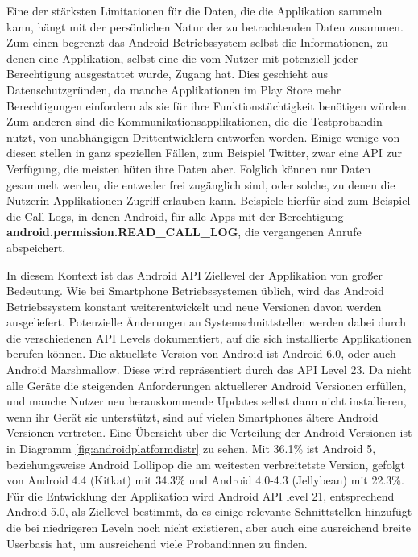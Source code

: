 Eine der stärksten Limitationen für die Daten, die die Applikation sammeln kann, hängt mit der persönlichen Natur der zu betrachtenden Daten zusammen.
Zum einen begrenzt das Android Betriebssystem selbst die Informationen, zu denen eine Applikation, selbst eine die vom Nutzer mit potenziell jeder Berechtigung ausgestattet wurde, Zugang hat.
Dies geschieht aus Datenschutzgründen, da manche Applikationen im Play Store mehr Berechtigungen einfordern als sie für ihre Funktionstüchtigkeit benötigen würden.
Zum anderen sind die Kommunikationsapplikationen, die die Testprobandin nutzt, von unabhängigen Drittentwicklern entworfen worden.
Einige wenige von diesen stellen in ganz speziellen Fällen, zum Beispiel Twitter\cite{twitterapi}, zwar eine API zur Verfügung, die meisten hüten ihre Daten aber.
Folglich können nur Daten gesammelt werden, die entweder frei zugänglich sind, oder solche, zu denen die Nutzerin Applikationen Zugriff erlauben kann.
Beispiele hierfür sind zum Beispiel die Call Logs, in denen Android, für alle Apps mit der Berechtigung \textbf{android.permission.READ\_CALL\_LOG}, die vergangenen Anrufe abspeichert.
\par

In diesem Kontext ist das Android API Ziellevel der Applikation von großer Bedeutung.
Wie bei Smartphone Betriebssystemen üblich, wird das Android Betriebssystem konstant weiterentwickelt und neue Versionen davon werden ausgeliefert.
Potenzielle Änderungen an Systemschnittstellen werden dabei durch die verschiedenen API Levels dokumentiert, auf die sich installierte Applikationen berufen können.
Die aktuellste Version von Android ist Android 6.0, oder auch Android Marshmallow.
Diese wird repräsentiert durch das API Level 23.
Da nicht alle Geräte die steigenden Anforderungen aktuellerer Android Versionen erfüllen, 
und manche Nutzer neu herauskommende Updates selbst dann nicht installieren, wenn ihr Gerät sie unterstützt, 
sind auf vielen Smartphones ältere Android Versionen vertreten.
Eine Übersicht über die Verteilung der Android Versionen ist in Diagramm \ref{fig:androidplatformdistr} zu sehen.
Mit 36.1\% ist Android 5, beziehungsweise Android Lollipop die am weitesten verbreitetste Version,
gefolgt von Android 4.4 (Kitkat) mit 34.3\% und Android 4.0-4.3 (Jellybean) mit 22.3\%\cite{androiddistr}.
Für die Entwicklung der Applikation wird Android API level 21, entsprechend Android 5.0, als Ziellevel bestimmt, da es einige relevante Schnittstellen hinzufügt die bei niedrigeren Leveln noch nicht existieren, aber auch eine ausreichend breite Userbasis hat, um ausreichend viele Probandinnen zu finden.


